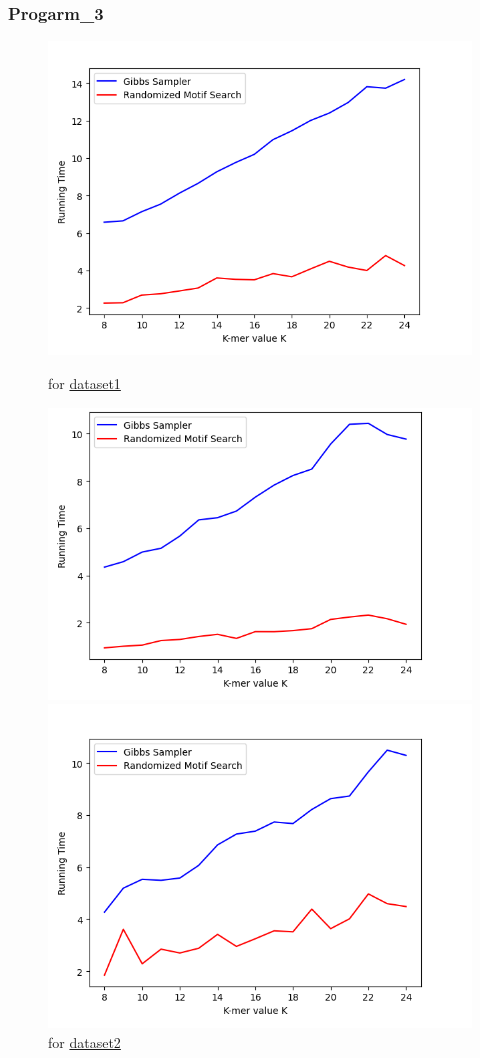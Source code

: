 \documentclass[11pt]{article}
\begin{document}
            \subsubsection{Progarm_3}
            \begin{figure}[htbp]
                \begin{minipage}[t]{0.5\columnwidth}
                    \centering
                    \includegraphics[width=0.5\columnwidth]{images/3-1.png} 
                    \caption{for \href{https://github.com/Superb-Man/Bio-Info/blob/master/data/hm03.txt}{dataset1}}
                    \label{fig:Fig-1}
                \end{minipage}
                \begin{minipage}[t]{0.5\columnwidth}
                    \centering
                    \includegraphics[width=0.5\columnwidth]{images/3-2.png} 
                    \caption{for \href{https://github.com/Superb-Man/Bio-Info/blob/master/data/yst04r.txt}{dataset2}}
                    \label{fig:Fig-2}
                \end{minipage}
                \begin{minipage}[t]{0.5\columnwidth}
                    \centering
                    \includegraphics[width=0.5\columnwidth]{images/3-3.png} 

\end{minipage}
\end{figure}
\end{document}
